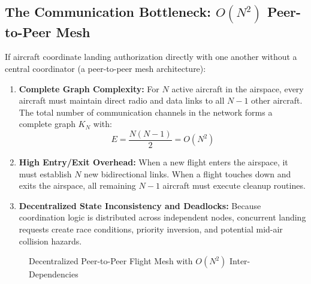 \documentclass[12pt,a4paper]{article}
\begin{document}
\subsection{\texorpdfstring{The Communication Bottleneck: $O(N^2)$ Peer-to-Peer Mesh}{The Communication Bottleneck: O(N^2) Peer-to-Peer Mesh}}
If aircraft coordinate landing authorization directly with one another without a central coordinator (a peer-to-peer mesh architecture):
\begin{enumerate}
    \item \textbf{Complete Graph Complexity:} For $N$ active aircraft in the airspace, every aircraft must maintain direct radio and data links to all $N-1$ other aircraft. The total number of communication channels in the network forms a complete graph $K_N$ with:
    \begin{equation}
        E = \frac{N(N-1)}{2} = O(N^2)
    \end{equation}
    \item \textbf{High Entry/Exit Overhead:} When a new flight enters the airspace, it must establish $N$ new bidirectional links. When a flight touches down and exits the airspace, all remaining $N-1$ aircraft must execute cleanup routines.
    \item \textbf{Decentralized State Inconsistency and Deadlocks:} Because coordination logic is distributed across independent nodes, concurrent landing requests create race conditions, priority inversion, and potential mid-air collision hazards.
\end{enumerate}

\begin{figure}[htbp]
\centering
{}
\caption{Decentralized Peer-to-Peer Flight Mesh with $O(N^2)$ Inter-Dependencies}
\label{fig:p2p_mesh}
\end{figure}
\end{document}

